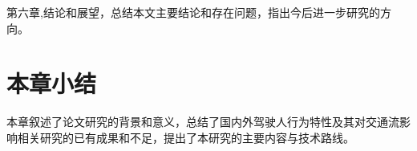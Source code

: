第六章,结论和展望，总结本文主要结论和存在问题，指出今后进一步研究的方向。
\section{本章小结}

本章叙述了论文研究的背景和意义，总结了国内外驾驶人行为特性及其对交通流影响相关研究的已有成果和不足，提出了本研究的主要内容与技术路线。